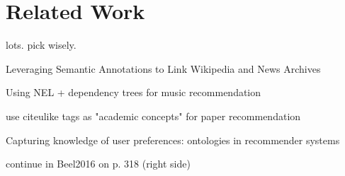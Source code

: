 \chapter{Related Work}\label{chap:relatedwork}
lots. pick wisely.

Leveraging Semantic Annotations to Link Wikipedia and News Archives\cite{Mishra2016}

Using NEL + dependency trees for music recommendation\cite{Sordo2015}

use citeulike tags as "academic concepts" for paper recommendation\cite{Jiang2012}

Capturing knowledge of user preferences: ontologies in recommender systems\cite{Middleton2001,Middleton2004}

continue in Beel2016 on p. 318 (right side)
